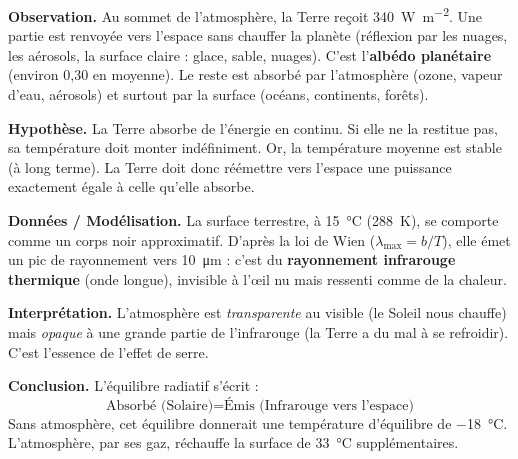 \documentclass[11pt]{article}
\begin{document}
\begin{experience}
\textbf{Observation.} Au sommet de l'atmosphère, la Terre reçoit \SI{340}{W.m^{-2}}. Une partie est renvoyée vers l'espace sans chauffer la planète (réflexion par les nuages, les aérosols, la surface claire : glace, sable, nuages). C'est l'\textbf{albédo planétaire} (environ 0,30 en moyenne). Le reste est absorbé par l'atmosphère (ozone, vapeur d'eau, aérosols) et surtout par la surface (océans, continents, forêts).

\textbf{Hypothèse.} La Terre absorbe de l'énergie en continu. Si elle ne la restitue pas, sa température doit monter indéfiniment. Or, la température moyenne est stable (à long terme). La Terre doit donc réémettre vers l'espace une puissance exactement égale à celle qu'elle absorbe.

\textbf{Données / Modélisation.} La surface terrestre, à \SI{15}{\celsius} (\SI{288}{K}), se comporte comme un corps noir approximatif. D'après la loi de Wien ($\lambda_{\max} = b/T$), elle émet un pic de rayonnement vers \SI{10}{\micro\meter} : c'est du \textbf{rayonnement infrarouge thermique} (onde longue), invisible à l'œil nu mais ressenti comme de la chaleur.

\textbf{Interprétation.} L'atmosphère est \emph{transparente} au visible (le Soleil nous chauffe) mais \emph{opaque} à une grande partie de l'infrarouge (la Terre a du mal à se refroidir). C'est l'essence de l'effet de serre.

\textbf{Conclusion.} L'équilibre radiatif s'écrit : 
\[
\text{Absorbé (Solaire)} = \text{Émis (Infrarouge vers l'espace)}
\]
Sans atmosphère, cet équilibre donnerait une température d'équilibre de \SI{-18}{\celsius}. L'atmosphère, par ses gaz, réchauffe la surface de \SI{33}{\celsius} supplémentaires.
\end{experience}
\end{document}
